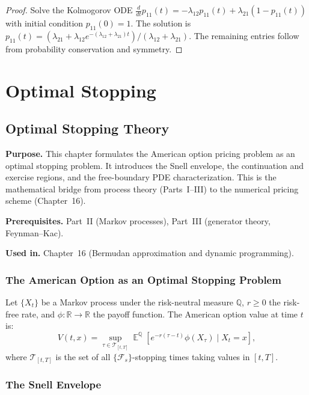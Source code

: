 \documentclass[11pt,a4paper,openany]{book}
\theoremstyle{definition}
\theoremstyle{plain}
\theoremstyle{remark}
\DeclareMathOperator{\E}{\mathbb{E}}
\newcommand{\1}{\mathbbm{1}}
\newcommand{\R}{\mathbb{R}}
\newcommand{\F}{\mathcal{F}}
\newcommand{\Q}{\mathbb{Q}}
\newcommand{\calT}{\mathcal{T}}
\begin{document}
\begin{proof}
Solve the Kolmogorov ODE $\frac{d}{dt}p_{11}(t) = -\lambda_{12}p_{11}(t) + \lambda_{21}(1 - p_{11}(t))$ with initial condition $p_{11}(0) = 1$. The solution is $p_{11}(t) = (\lambda_{21} + \lambda_{12} e^{-(\lambda_{12}+\lambda_{21})t}) / (\lambda_{12}+\lambda_{21})$. The remaining entries follow from probability conservation and symmetry.
\end{proof}

\part{Optimal Stopping}

\chapter{Optimal Stopping Theory}

\noindent\textbf{Purpose.} This chapter formulates the American option pricing problem as an optimal stopping problem. It introduces the Snell envelope, the continuation and exercise regions, and the free-boundary PDE characterization. This is the mathematical bridge from process theory (Parts~I--III) to the numerical pricing scheme (Chapter~16).

\textbf{Prerequisites.} Part~II (Markov processes), Part~III (generator theory, Feynman--Kac).

\textbf{Used in.} Chapter~16 (Bermudan approximation and dynamic programming).

\section{The American Option as an Optimal Stopping Problem}

Let $\{X_{t}\}$ be a Markov process under the risk-neutral measure $\Q$, $r \geq 0$ the risk-free rate, and $\phi: \R \to \R$ the payoff function. The American option value at time $t$ is:
\[
V(t,x) = \sup_{\tau \in \calT_{[t,T]}} \E^{\Q}\left[e^{-r(\tau-t)} \phi(X_{\tau}) \mid X_{t} = x\right],
\]
where $\calT_{[t,T]}$ is the set of all $\{\F_{s}\}$-stopping times taking values in $[t,T]$.

\section{The Snell Envelope}
\end{document}
